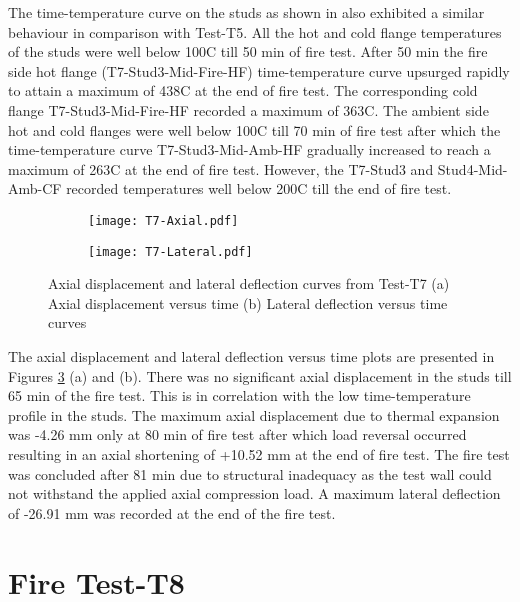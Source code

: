 The time-temperature curve on the studs as shown in  also exhibited a similar behaviour in comparison with Test-T5. All the hot and cold flange temperatures of the studs were well below 100\degree C till 50 min of fire test. After 50 min the fire side hot flange (T7-Stud3-Mid-Fire-HF) time-temperature curve upsurged rapidly to attain a maximum of 438\degree C at the end of fire test. The corresponding cold flange T7-Stud3-Mid-Fire-HF recorded a maximum of 363\degree C. The ambient side hot and cold flanges were well below 100\degree C till 70 min of fire test after which the time-temperature curve T7-Stud3-Mid-Amb-HF gradually increased to reach a maximum of 263\degree C at the end of fire test. However, the T7-Stud3 and Stud4-Mid-Amb-CF recorded temperatures well below 200\degree C till the end of fire test.  
\begin{figure}[!htbp]
	\centering
	\begin{subfigure}[b]{0.7\textwidth}
		\centering
		\texttt{[image: T7-Axial.pdf]}
		\caption{}
		\label{subfig:T7-Axial}
	\end{subfigure}
	\begin{subfigure}[b]{0.7\textwidth}
		\centering
		\texttt{[image: T7-Lateral.pdf]}
		\caption{}
		\label{subfig:T7-Lateral}
	\end{subfigure}
	   \caption{Axial displacement and lateral deflection curves from Test-T7 (a) Axial displacement versus time (b) Lateral deflection versus time curves}
	   \label{fig:T7-Axial-Lateral}
\end{figure}

The axial displacement and lateral deflection versus time plots are presented in Figures \ref{fig:T7-Axial-Lateral} (a) and (b). There was no significant axial displacement in the studs till 65 min of the fire test. This is in correlation with the low time-temperature profile in the studs. The maximum axial displacement due to thermal expansion was -4.26 mm only at 80 min of fire test after which load reversal occurred resulting in an axial shortening of +10.52 mm at the end of fire test. The fire test was concluded after 81 min due to structural inadequacy as the test wall could not withstand the applied axial compression load. A maximum lateral deflection of -26.91 mm was recorded at the end of the fire test.  

\section{Fire Test-T8}
